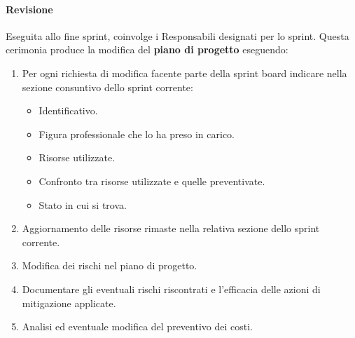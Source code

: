 \paragraph{Revisione}
Eseguita allo fine sprint, coinvolge i Responsabili designati per lo sprint.
Questa cerimonia produce la modifica del \textbf{piano di progetto} eseguendo:
\begin{enumerate}
    \item Per ogni richiesta di modifica facente parte della sprint board indicare nella sezione consuntivo dello sprint corrente:
    \begin{itemize}
        \item Identificativo.
        \item Figura professionale che lo ha preso in carico.
        \item Risorse utilizzate.
        \item Confronto tra risorse utilizzate e quelle preventivate.
        \item Stato in cui si trova.
    \end{itemize}
    \item Aggiornamento delle risorse rimaste nella relativa sezione dello sprint corrente.
    \item Modifica dei rischi nel piano di progetto.
    \item Documentare gli eventuali rischi riscontrati e l'efficacia delle azioni di mitigazione applicate.
    \item Analisi ed eventuale modifica del preventivo dei costi.
\end{enumerate}


